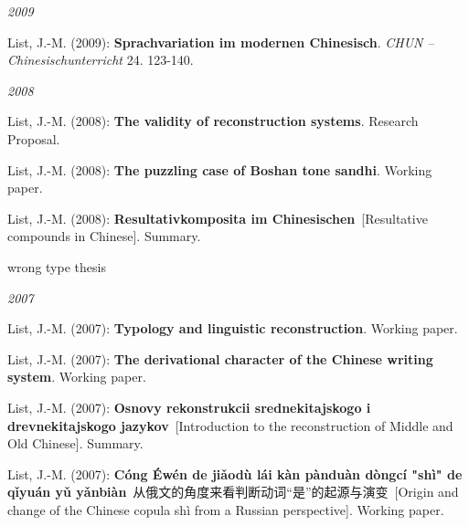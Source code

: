 \par
\noindent\textit{2009}\par\nopagebreak\vspace{0.25cm}
\nopagebreak\noindent List, J.-M. (2009): \textbf{Sprachvariation im modernen Chinesisch}. \textit{CHUN -- Chinesischunterricht} 24. 123-140.\vspace{0.25cm}
\par
\noindent\textit{2008}\par\nopagebreak\vspace{0.25cm}
\nopagebreak\noindent List, J.-M. (2008): \textbf{The validity of reconstruction systems}. Research Proposal.\vspace{0.25cm}
\par
\nopagebreak\noindent List, J.-M. (2008): \textbf{The puzzling case of Boshan tone sandhi}. Working paper.\vspace{0.25cm}
\par
\nopagebreak\noindent List, J.-M. (2008): \textbf{Resultativkomposita im Chinesischen}\ [Resultative compounds in Chinese]. Summary.\vspace{0.25cm}
\par
\nopagebreak\noindent wrong type thesis\vspace{0.25cm}
\par
\noindent\textit{2007}\par\nopagebreak\vspace{0.25cm}
\nopagebreak\noindent List, J.-M. (2007): \textbf{Typology and linguistic reconstruction}. Working paper.\vspace{0.25cm}
\par
\nopagebreak\noindent List, J.-M. (2007): \textbf{The derivational character of the Chinese writing system}. Working paper.\vspace{0.25cm}
\par
\nopagebreak\noindent List, J.-M. (2007): \textbf{Osnovy rekonstrukcii srednekitajskogo i drevnekitajskogo jazykov}\ [Introduction to the reconstruction of Middle and Old Chinese]. Summary.\vspace{0.25cm}
\par
\nopagebreak\noindent List, J.-M. (2007): \textbf{Cóng Éwén de jiǎodù lái kàn pànduàn dòngcí "shì" de qǐyuán yǔ yǎnbiàn}\ {\hana 从俄文的角度来看判断动词“是”的起源与演变}\ [Origin and change of the Chinese copula shì from a Russian perspective]. Working paper.\vspace{0.25cm}
\par
